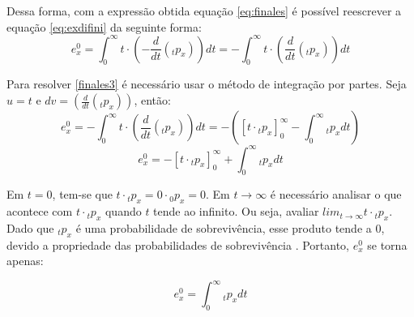 Dessa forma, com a expressão obtida equação \ref{eq:finales} é possível reescrever a equação \ref{eq:exdifini} da seguinte forma:
\begin{equation}
    e_{x}^{0} = \int_{0}^{\infty} t \cdot \left( -\frac{d}{dt}({}_tp_x) \right)dt = -\int_{0}^{\infty} t \cdot \left(\frac{d}{dt}({}_tp_x) \right)dt
    \label{finales3}
\end{equation}

Para resolver \ref{finales3} é necessário usar o método de integração por partes. Seja $u=t$ e $dv=\left(\frac{d}{dt}({}_tp_x) \right)$, então:
\begin{equation}
    e_{x}^{0} = -\int_{0}^{\infty} t \cdot \left(\frac{d}{dt}({}_tp_x) \right)dt = -\left(\left[t \cdot {}_{t}p_x \right]_{0}^{\infty} - \int_0^{\infty} {}_{t}p_xdt\right)
\end{equation}
\begin{equation}
    e_{x}^{0} = -\left[t \cdot {}_{t}p_x \right]_{0}^{\infty} + \int_0^{\infty} {}_{t}p_x dt
\end{equation}

Em $t=0$, tem-se que $t\cdot {}_{t}p_x = 0 \cdot {}_{0}p_x = 0$. Em $t \to \infty$ é necessário analisar o que acontece com $t \cdot {}_{t}p_x$ quando $t$ tende ao infinito. Ou seja, avaliar $lim_{t \to \infty} t \cdot {}_{t}p_x$. Dado que ${}_{t}p_x$ é uma probabilidade de sobrevivência, esse produto tende a 0, devido a propriedade das probabilidades de sobrevivência \cite{dickson2019}. Portanto, $e_x^{0}$ se torna apenas:

\begin{equation}
    e_{x}^{0} = \int_0^{\infty} {}_{t}p_x dt
    \label{eq:exfinal100}
\end{equation}